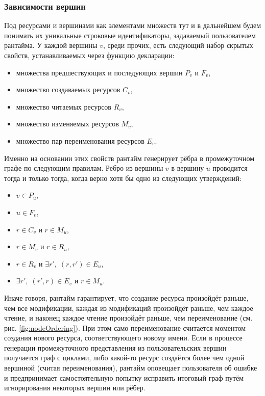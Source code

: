 \subsubsection{Зависимости вершин}
Под ресурсами и вершинами как элементами множеств тут и в дальнейшем будем понимать их уникальные строковые идентификаторы, задаваемый пользователем рантайма.
У каждой вершины $v$, среди прочих, есть следующий набор скрытых свойств, устанавливаемых через функцию декларации:
\begin{itemize}
    \item множества предшествующих и последующих вершин $P_v$ и $F_v$,
    \item множество создаваемых ресурсов $C_v$,
    \item множество читаемых ресурсов $R_v$,
    \item множество изменяемых ресурсов $M_v$,
    \item множество пар переименования ресурсов $E_v$.
\end{itemize}
Именно на основании этих свойств рантайм генерирует рёбра в промежуточном графе по следующим правилам.
Ребро из вершины $v$ в вершину $u$ проводится тогда и только тогда, когда верно хотя бы одно из следующих утверждений:
\begin{itemize}
    \item $v\in P_u$,
    \item $u\in F_v$,
    \item $r \in C_v$ и $r \in M_u$,
    \item $r \in M_v$ и $r \in R_u$,
    \item $r \in R_v$ и $\exists r',\;(r, r') \in E_u$,
    \item $\exists r',\;(r', r) \in E_v$ и $r \in M_u$.
\end{itemize}
Иначе говоря, рантайм гарантирует, что создание ресурса произойдёт раньше, чем все модификации, каждая из модификаций произойдёт раньше, чем каждое чтение, и наконец каждое чтение произойдёт раньше, чем переименование (см. рис. \ref{fig:nodeOrdering}).
При этом само переименование считается моментом создания нового ресурса, соответствующего новому имени.
Если в процессе генерации промежуточного представления из пользовательских вершин получается граф с циклами, либо какой-то ресурс создаётся более чем одной вершиной (считая переименования), рантайм оповещает пользователя об ошибке и предпринимает самостоятельную попытку исправить итоговый граф путём игнорирования некоторых вершин или рёбер.

